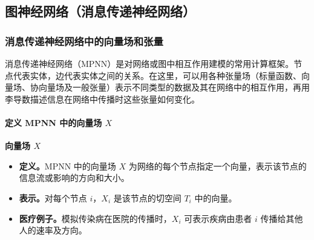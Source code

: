 \subsection{图神经网络（消息传递神经网络）}
\subsubsection{消息传递神经网络中的向量场和张量}
消息传递神经网络（MPNN）是对网络或图中相互作用建模的常用计算框架。节点代表实体，边代表实体之间的关系。在这里，可以用各种张量场（标量函数、向量场、协向量场及一般张量）表示不同类型的数据及其在网络中的相互作用，再用李导数描述信息在网络中传播时这些张量如何变化。

\paragraph{\texorpdfstring{定义 MPNN 中的向量场 $X$}{定义 MPNN 中的向量场 X}}
\textbf{向量场 $X$}
\begin{itemize}
  \item \textbf{定义。}MPNN 中的向量场 $X$ 为网络的每个节点指定一个向量，表示该节点的信息流或影响的方向和大小。
  \item \textbf{表示。}对每个节点 $i$，$X_i$ 是该节点的切空间 $T_i$ 中的向量。
  \item \textbf{医疗例子。}模拟传染病在医院的传播时，$X_i$ 可表示疾病由患者 $i$ 传播给其他人的速率及方向。
\end{itemize}

